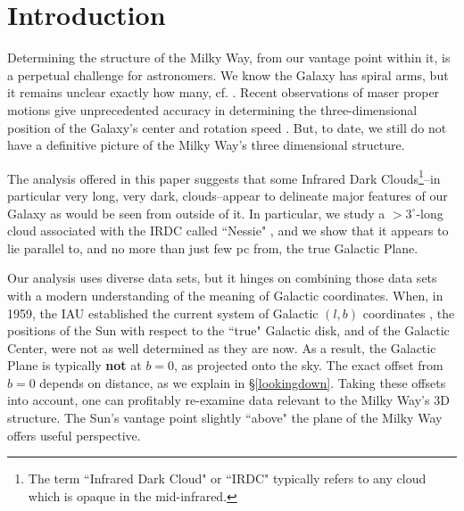 \section{Introduction}

Determining the structure of the Milky Way, from our vantage point within it, is a perpetual challenge for astronomers. We know the Galaxy has spiral arms, but it remains unclear exactly how many, cf. \citep{Vallee2008a}. Recent observations of maser proper motions give unprecedented accuracy in determining the three-dimensional position of the Galaxy's center and rotation speed \citep{Reid2009,Brunthaler2011}. But, to date, we still do not have a definitive picture of the Milky Way's three dimensional structure.

The analysis offered in this paper suggests that some Infrared Dark Clouds\footnote {The term ``Infrared Dark Cloud" or ``IRDC" typically refers to any cloud which is opaque in the mid-infrared.}--in particular very long, very dark, clouds--appear to delineate major features of our Galaxy as would be seen from outside of it. In particular, we study a $>3^{\circ}$-long cloud associated with the IRDC called ``Nessie" \citep{Jackson2010}, and we show that it appears to lie parallel to, and no more than just few pc from, the true Galactic Plane.

Our analysis uses diverse data sets, but it hinges on combining those data sets with a modern understanding of the meaning of Galactic coordinates. When, in 1959, the IAU established the current system of Galactic $(l,b)$ coordinates \citep{Blaauw1959}, the positions of the Sun with respect to the ``true" Galactic disk, and of the Galactic Center, were not as well determined as they are now. As a result, the Galactic Plane is typically \textbf{not} at $b=0$, as
projected onto the sky. The exact offset from $b=0$ depends on distance, as we explain in \S \ref{lookingdown}. Taking these offsets into account, one can profitably re-examine data relevant to the Milky Way's 3D structure.  The Sun's vantage point slightly ``above" the plane of the Milky Way offers useful perspective.

